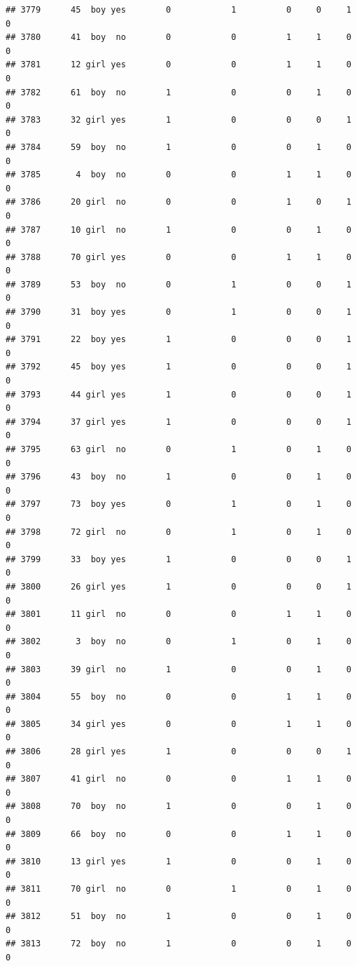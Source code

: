 \documentclass[man]{apa6}
\begin{document}
\begin{verbatim}
## 3779      45  boy yes        0            1          0     0     1     0
## 3780      41  boy  no        0            0          1     1     0     0
## 3781      12 girl yes        0            0          1     1     0     0
## 3782      61  boy  no        1            0          0     1     0     0
## 3783      32 girl yes        1            0          0     0     1     0
## 3784      59  boy  no        1            0          0     1     0     0
## 3785       4  boy  no        0            0          1     1     0     0
## 3786      20 girl  no        0            0          1     0     1     0
## 3787      10 girl  no        1            0          0     1     0     0
## 3788      70 girl yes        0            0          1     1     0     0
## 3789      53  boy  no        0            1          0     0     1     0
## 3790      31  boy yes        0            1          0     0     1     0
## 3791      22  boy yes        1            0          0     0     1     0
## 3792      45  boy yes        1            0          0     0     1     0
## 3793      44 girl yes        1            0          0     0     1     0
## 3794      37 girl yes        1            0          0     0     1     0
## 3795      63 girl  no        0            1          0     1     0     0
## 3796      43  boy  no        1            0          0     1     0     0
## 3797      73  boy yes        0            1          0     1     0     0
## 3798      72 girl  no        0            1          0     1     0     0
## 3799      33  boy yes        1            0          0     0     1     0
## 3800      26 girl yes        1            0          0     0     1     0
## 3801      11 girl  no        0            0          1     1     0     0
## 3802       3  boy  no        0            1          0     1     0     0
## 3803      39 girl  no        1            0          0     1     0     0
## 3804      55  boy  no        0            0          1     1     0     0
## 3805      34 girl yes        0            0          1     1     0     0
## 3806      28 girl yes        1            0          0     0     1     0
## 3807      41 girl  no        0            0          1     1     0     0
## 3808      70  boy  no        1            0          0     1     0     0
## 3809      66  boy  no        0            0          1     1     0     0
## 3810      13 girl yes        1            0          0     1     0     0
## 3811      70 girl  no        0            1          0     1     0     0
## 3812      51  boy  no        1            0          0     1     0     0
## 3813      72  boy  no        1            0          0     1     0     0

\end{verbatim}
\end{document}
